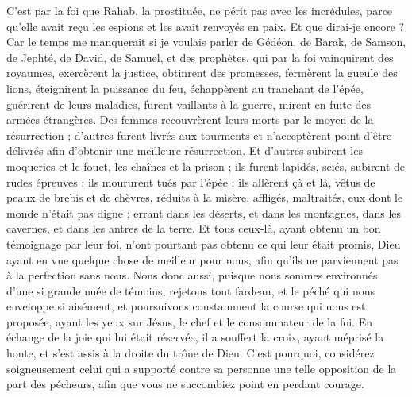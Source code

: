 \begin{multicols}{2}
C’est par la foi que Rahab, la prostituée, ne périt pas avec les incrédules, parce qu’elle avait reçu les espions et les avait renvoyés en paix.
Et que dirai-je encore ? Car le temps me manquerait si je voulais parler de Gédéon, de Barak, de Samson, de Jephté, de David, de Samuel, et des prophètes,
qui par la foi vainquirent des royaumes, exercèrent la justice, obtinrent des promesses, fermèrent la gueule des lions,
éteignirent la puissance du feu, échappèrent au tranchant de l’épée, guérirent de leurs maladies, furent vaillants à la guerre, mirent en fuite des armées étrangères.
Des femmes recouvrèrent leurs morts par le moyen de la résurrection ; d'autres furent livrés aux tourments et n’acceptèrent point d'être délivrés afin d'obtenir une meilleure résurrection.
Et d'autres subirent les moqueries et le fouet, les chaînes et la prison ;
ils furent lapidés, sciés, subirent de rudes épreuves ; ils moururent tués par l'épée ; ils allèrent çà et là, vêtus de peaux de brebis et de chèvres, réduits à la misère, affligés, maltraités,
eux dont le monde n'était pas digne ; errant dans les déserts, et dans les montagnes, dans les cavernes, et dans les antres de la terre.
Et tous ceux-là, ayant obtenu un bon témoignage par leur foi, n'ont pourtant pas obtenu ce qui leur était promis,
Dieu ayant en vue quelque chose de meilleur pour nous, afin qu'ils ne parviennent pas à la perfection sans nous.
\VerseOne{}Nous donc aussi, puisque nous sommes environnés d'une si grande nuée de témoins, rejetons tout fardeau, et le péché qui nous enveloppe si aisément, et poursuivons constamment la course qui nous est proposée,
ayant les yeux sur Jésus, le chef et le consommateur de la foi. En échange de la joie qui lui était réservée, il a souffert la croix, ayant méprisé la honte, et s'est assis à la droite du trône de Dieu.
C'est pourquoi, considérez soigneusement celui qui a supporté contre sa personne une telle opposition de la part des pécheurs, afin que vous ne succombiez point en perdant courage.

\end{multicols}
